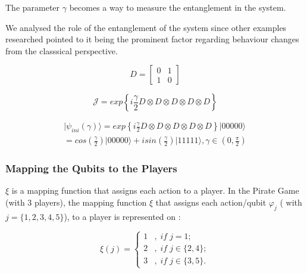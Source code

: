\documentclass[10pt,twocolumn]{llncs}
\begin{document}
The parameter $\gamma$ becomes a way to measure the entanglement in the system\cite{Eisert2008}. 

We analysed the role of the entanglement of the system since other examples researched pointed to it being the prominent factor regarding behaviour changes from the classsical perspective\cite{Fra2011a}\cite{Fra2011}\cite{Letters2002}\cite{Khan2011}\cite{Ricketts2006}. 


\begin{equation}
D=\left[\begin{array}{cc}
0 & 1\\
1 & 0
\end{array}\right]
\label{eq:DDDDDDDrica}
\end{equation} 



\begin{equation}
\mathcal{J}=exp\left\{ i\frac{\gamma}{2} D \otimes D \otimes D \otimes D 
\otimes D
\right\} 
\label{eq:matrix_exponencial_esoterica}
\end{equation} 

\begin{center}
\begin{equation}
\begin{split}
\vert\psi_{ini}(\gamma)\rangle=exp\left\{ i\frac{\gamma}{2} D \otimes D \otimes D \otimes D 
\otimes D\right\} \vert00000\rangle \\
=cos(\frac{\gamma}{2})\vert00000\rangle+isin(\frac{\gamma}{2})\vert11111\rangle,\gamma\in(0,\frac{\pi}{2})
 \end{split}
\label{eq:estado_inicial_pg}
\end{equation}
\end{center}


\subsubsection{Mapping the Qubits to the Players} $\xi$ is a mapping function that assigns each action to a player. In the Pirate Game (with $3$ players), the mapping function $\xi$ that assigns each action/qubit $\varphi_{j}$ ( with $j=\{ 1, 2, 3, 4, 5\}$), to a player is represented on :

\begin{equation}
\xi(j)=\begin{cases}
1 & ,\; if\; j=1;\\
2 & ,\; if\; j\in\{2,4\};\\
3 & ,\; if\; j\in\{3,5\}.
\end{cases}
\label{playerxiximapping}
\end{equation}
\end{document}
